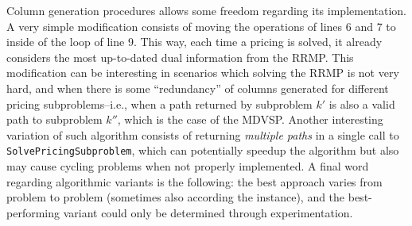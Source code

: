 \documentclass{article}
\begin{document}
Column generation procedures allows some freedom regarding its implementation. A very simple modification consists of moving the operations of lines 6 and 7 to inside of the loop of line 9. This way, each time a pricing is solved, it already considers the most up-to-dated dual information from the RRMP. This modification can be interesting in scenarios which solving the RRMP is not very hard, and when there is some ``redundancy'' of columns generated for different pricing subproblems--i.e., when a path returned by subproblem $k'$ is also a valid path to subproblem $k''$, which is the case of the MDVSP. Another interesting variation of such algorithm consists of returning \textit{multiple paths} in a single call to \texttt{SolvePricingSubproblem}, which can potentially speedup the algorithm but also may cause cycling problems when not properly implemented. A final word regarding algorithmic variants is the following: the best approach varies from problem to problem (sometimes also according the instance), and the best-performing variant could only be determined through experimentation.
\end{document}
